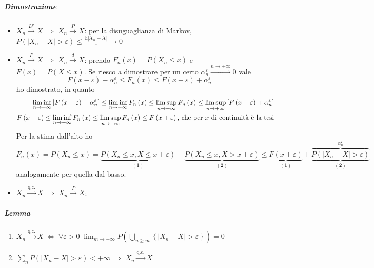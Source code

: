 \documentclass[a4paper,10pt]{article}
\theoremstyle{remark}
\theoremstyle{definition}
\begin{document}
\subparagraph*{Dimostrazione}
\begin{itemize}
\item $X_{n}\overset{L^{p}}{\longrightarrow}X\;\Longrightarrow\;X_{n}\overset{P}{\longrightarrow}X$:
per la disuguaglianza di Markov, $P\left(\left|X_{n}-X\right|>\varepsilon\right)\leq\frac{\mathbb{E}\left|X_{n}-X\right|}{\varepsilon}\longrightarrow0$
\item $X_{n}\overset{P}{\longrightarrow}X\;\Longrightarrow\;X_{n}\overset{d}{\longrightarrow}X$:
prendo $F_{n}\left(x\right)=P\left(X_{n}\leq x\right)$ e $F\left(x\right)=P\left(X\leq x\right)$.
Se riesco a dimostrare per un certo $\alpha_{n}^{\varepsilon}\overset{n\rightarrow+\infty}{\longrightarrow}0$
vale
\[
F\left(x-\varepsilon\right)-\alpha_{n}^{\varepsilon}\leq F_{n}\left(x\right)\leq F\left(x+\varepsilon\right)+\alpha_{n}^{\varepsilon}
\]
ho dimostrato, in quanto
\begin{align*}
\liminf_{n\rightarrow+\infty}\left[F\left(x-\varepsilon\right)-\alpha_{n}^{\varepsilon}\right]\leq\liminf_{n\rightarrow+\infty}F_{n}\left(x\right)\leq\limsup_{n\rightarrow+\infty}F_{n}\left(x\right)\leq\limsup_{n\rightarrow+\infty}\left[F\left(x+\varepsilon\right)+\alpha_{n}^{\varepsilon}\right]\\
F\left(x-\varepsilon\right)\leq\liminf_{n\rightarrow+\infty}F_{n}\left(x\right)\leq\limsup_{n\rightarrow+\infty}F_{n}\left(x\right)\leq F\left(x+\varepsilon\right)\text{, che per \ensuremath{x} di continuità è la tesi}
\end{align*}
Per la stima dall'alto ho
\[
F_{n}\left(x\right)=P\left(X_{n}\leq x\right)=\underset{\left(\boldsymbol{1}\right)}{\underbrace{P\left(X_{n}\leq x,X\leq x+\varepsilon\right)}}+\underset{\left(\boldsymbol{2}\right)}{\underbrace{P\left(X_{n}\leq x,X>x+\varepsilon\right)}}\leq\underset{\left(\boldsymbol{1}\right)}{\underbrace{F\left(x+\varepsilon\right)}}+\underset{\left(\boldsymbol{2}\right)}{\underbrace{\overset{\alpha_{n}^{\varepsilon}}{\overbrace{P\left(\left|X_{n}-X\right|>\varepsilon\right)}}}}
\]
analogamente per quella dal basso.
\item $X_{n}\overset{\text{q.c.}}{\longrightarrow}X\;\Longrightarrow\;X_{n}\overset{P}{\longrightarrow}X$:
\end{itemize}

\subparagraph*{Lemma}
\begin{enumerate}
\item $X_{n}\overset{\text{q.c.}}{\longrightarrow}X\;\Longleftrightarrow\;\forall\varepsilon>0\;\lim_{m\rightarrow+\infty}P\left(\bigcup_{n\geq m}\left\{ \left|X_{n}-X\right|>\varepsilon\right\} \right)=0$
\item $\sum_{n}P\left(\left|X_{n}-X\right|>\varepsilon\right)<+\infty\;\Longrightarrow\;X_{n}\overset{\text{q.c.}}{\longrightarrow}X$
\end{enumerate}
\end{document}

